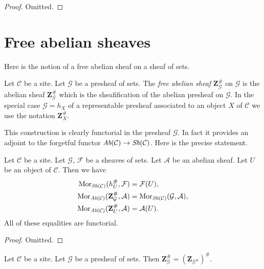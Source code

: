 \begin{proof}
Omitted.
\end{proof}



\section{Free abelian sheaves}
\label{section-free-abelian-sheaf}

\noindent
Here is the notion of a free abelian sheaf on a sheaf of sets.

\begin{definition}
\label{definition-free-abelian-sheaf-on}
Let $\mathcal{C}$ be a site. Let $\mathcal{G}$ be a presheaf of sets.
The {\it free abelian sheaf} $\mathbf{Z}_\mathcal{G}^\#$
on $\mathcal{G}$ is the abelian sheaf $\mathbf{Z}_\mathcal{G}^\#$
which is the sheafification of the abelian presheaf on $\mathcal{G}$.
In the special case $\mathcal{G} = h_X$ of a representable presheaf
associated to an object $X$ of $\mathcal{C}$
we use the notation $\mathbf{Z}_X^\#$.
\end{definition}

\noindent
This construction is clearly functorial in the presheaf $\mathcal{G}$.
In fact it provides an adjoint to the forgetful functor
$\textit{Ab}(\mathcal{C}) \to \mathop{\textit{Sh}}\nolimits(\mathcal{C})$.
Here is the precise statement.

\begin{lemma}
\label{lemma-obvious-adjointness-sheaves}
Let $\mathcal{C}$ be a site.
Let $\mathcal{G}$, $\mathcal{F}$ be a sheaves of sets.
Let $\mathcal{A}$ be an abelian sheaf.
Let $U$ be an object of $\mathcal{C}$. Then
we have
\begin{align*}
\mathop{\rm Mor}\nolimits_{\mathop{\textit{Sh}}\nolimits(\mathcal{C})}(h_U^\#, \mathcal{F})
& =
\mathcal{F}(U), \\
\mathop{\rm Mor}\nolimits_{\textit{Ab}(\mathcal{C})}(\mathbf{Z}_\mathcal{G}^\#,
\mathcal{A})
& =
\mathop{\rm Mor}\nolimits_{\mathop{\textit{Sh}}\nolimits(\mathcal{C})}(\mathcal{G}, \mathcal{A}), \\
\mathop{\rm Mor}\nolimits_{\textit{Ab}(\mathcal{C})}(\mathbf{Z}_U^\#, \mathcal{A})
& =
\mathcal{A}(U).
\end{align*}
All of these equalities are functorial.
\end{lemma}

\begin{proof}
Omitted.
\end{proof}

\begin{lemma}
\label{lemma-may-sheafify-before-abelianize}
Let $\mathcal{C}$ be a site.
Let $\mathcal{G}$ be a presheaf of sets.
Then $\mathbf{Z}_\mathcal{G}^\# = (\mathbf{Z}_{\mathcal{G}^\#})^\#$.
\end{lemma}

